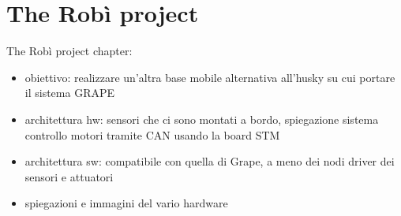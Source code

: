 
\chapter{The Robì project} \label{chap:robìProject}

The Robì project chapter:


\begin{itemize}
	\item obiettivo: realizzare un'altra base mobile alternativa all'husky su cui portare il sistema GRAPE
	\item architettura hw: sensori che ci sono montati a bordo, spiegazione sistema controllo motori tramite CAN usando la board STM
	\item architettura sw: compatibile con quella di Grape, a meno dei nodi driver dei sensori e attuatori
	\item spiegazioni e immagini del vario hardware
\end{itemize}
